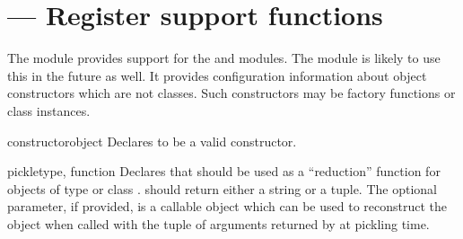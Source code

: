 \section{ ---
         Register  support functions}



The  module provides support for the
 and
 modules.  The
 module is likely to use this in the
future as well.  It provides configuration information about object
constructors which are not classes.  Such constructors may be factory
functions or class instances.


\begin{funcdesc}{constructor}{object}
  Declares  to be a valid constructor.
\end{funcdesc}

\begin{funcdesc}{pickle}{type, function}
  Declares that  should be used as a ``reduction''
  function for objects of type or class .  
  should return either a string or a tuple.  The optional
   parameter, if provided, is a callable object which
  can be used to reconstruct the object when called with the tuple of
  arguments returned by  at pickling time.
\end{funcdesc}
